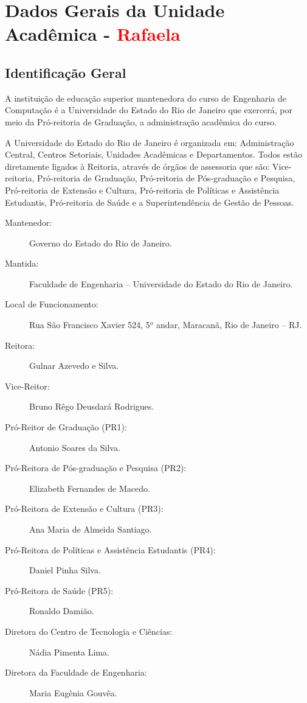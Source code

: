 \chapter{Dados Gerais da Unidade Acadêmica - \textcolor{red}{Rafaela}}


\section{Identificação Geral}

A instituição de educação superior mantenedora do curso de Engenharia de Computação é a Universidade do Estado do Rio de Janeiro que exercerá, por meio da Pró-reitoria de Graduação, a administração acadêmica do curso.

A Universidade do Estado do Rio de Janeiro é organizada em: Administração Central, Centros Setoriais, Unidades Acadêmicas e Departamentos. Todos estão diretamente ligados à Reitoria, através de órgãos de assessoria que são: Vice-reitoria, Pró-reitoria de Graduação, Pró-reitoria de Pós-graduação e Pesquisa, Pró-reitoria de Extensão e Cultura, Pró-reitoria de Políticas e Assistência Estudantis, Pró-reitoria de Saúde e a Superintendência de Gestão de Pessoas.


\begin{description}
	\item[Mantenedor:] Governo do Estado do Rio de Janeiro.
	\item [Mantida:] Faculdade de Engenharia -- Universidade do Estado do Rio de Janeiro.
	\item [Local de Funcionamento:] Rua São Francisco Xavier 524, 5$^{o}$ andar, Maracanã, Rio de Janeiro -- RJ.
	\item [Reitora:] Gulnar Azevedo e Silva.
	\item [Vice-Reitor:] Bruno Rêgo Deusdará Rodrigues.
	\item [Pró-Reitor de Graduação (PR1):] Antonio Soares da Silva.
	\item [Pró-Reitora de Pós-graduação e Pesquisa (PR2):] Elizabeth Fernandes de Macedo.
	\item [Pró-Reitora de Extensão e Cultura (PR3):] Ana Maria de Almeida Santiago.
	\item [Pró-Reitora de Políticas e Assistência Estudantis (PR4):] Daniel Pinha Silva.
	\item [Pró-Reitora de Saúde (PR5):] Ronaldo Damião.
	\item [Diretora do Centro de Tecnologia e Ciências:] Nádia Pimenta Lima.
	\item [Diretora da Faculdade de Engenharia:]  Maria Eugênia Gouvêa.
\end{description}

